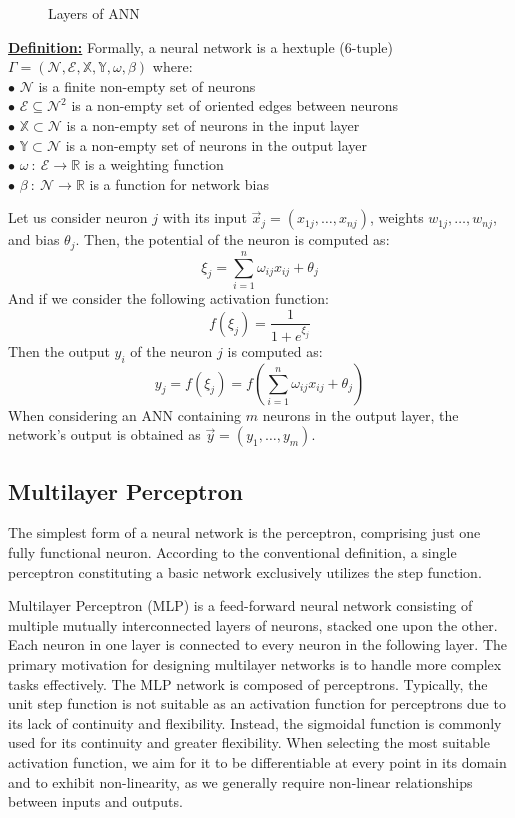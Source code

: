 \documentclass[a4paper]{report}
\begin{document}
{\begin{figure}[H]
\begin{center}
\begin{tikzpicture}[x=2.2cm,y=1.4cm]
\end{tikzpicture}
\end{center}
\caption{Layers of ANN}
\end{figure}
\textbf{\underline{Definition:}} Formally, a neural network is a hextuple (6-tuple) $\Gamma=(\mathcal{N}, \mathcal{E}, \mathbb{X}, \mathbb{Y}, \omega, \beta)$ where:\\
$\bullet$ $\mathcal{N}$ is a finite non-empty set of neurons\\
$\bullet$ $\mathcal{E} \subseteq \mathcal{N}^2$ is a non-empty set of oriented edges between neurons\\
$\bullet$ $\mathbb{X}\subset \mathcal{N}$ is a non-empty set of neurons in the input layer\\
$\bullet$ $\mathbb{Y}\subset \mathcal{N}$ is a non-empty set of neurons in the output layer\\
$\bullet$ $\omega\::\:\mathcal{E}\rightarrow\mathbb{R}$ is a weighting function\\
$\bullet$ $\beta\::\:\mathcal{N}\rightarrow\mathbb{R}$ is a function for network bias

\vspace{1cm}
Let us consider neuron \( j \) with its input \(\vec{x}_j = (x_{1j}, \ldots, x_{nj})\), weights \(w_{1j}, \ldots, w_{nj}\), and bias \(\theta_j\). Then, the potential of the neuron is computed as:
$$\xi_j=\sum_{i=1}^{n}\omega_{ij}x_{ij}+\theta_j$$
And if we consider the following activation function:
$$f(\xi_j)=\frac{1}{1+e^{\xi_j}}$$
Then the output $y_i$ of the neuron $j$ is computed as:
$$y_j=f(\xi_j)=f\left(\sum_{i=1}^n\omega_{ij}x_{ij}+\theta_j\right)$$
When considering an ANN containing \(m\) neurons in the output layer, the network's output is obtained as \(\vec{y} = (y_1, \ldots, y_m)\).
\newpage
\subsection{Multilayer Perceptron}
The simplest form of a neural network is the perceptron, comprising just one fully functional neuron. According to the conventional definition, a single perceptron constituting a basic network exclusively utilizes the step function.

Multilayer Perceptron (MLP) is a feed-forward neural network consisting of multiple mutually interconnected layers of neurons, stacked one upon the other. Each neuron in one layer is connected to every neuron in the following layer. The primary motivation for designing multilayer networks is to handle more complex tasks effectively. The MLP network is composed of perceptrons. Typically, the unit step function is not suitable as an activation function for perceptrons due to its lack of continuity and flexibility. Instead, the sigmoidal function is commonly used for its continuity and greater flexibility. When selecting the most suitable activation function, we aim for it to be differentiable at every point in its domain and to exhibit non-linearity, as we generally require non-linear relationships between inputs and outputs.

}
\end{document}
